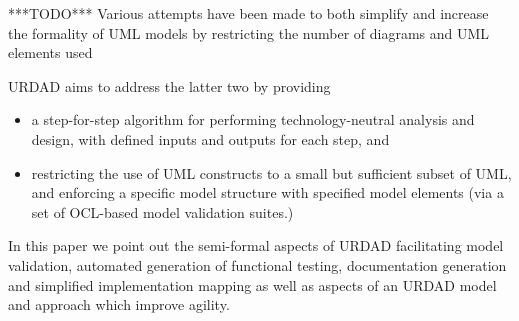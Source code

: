 ***TODO*** Various attempts have been made to both simplify and increase the formality of UML models by
restricting the number of diagrams and UML elements used 
\cite{Cheng:integratingInformalAndFormalApproachesToRequirementsModelingAndAnalysis}

URDAD aims to address the latter two by providing
\begin{itemize}
  \item a step-for-step algorithm for performing technology-neutral analysis and design, with defined inputs and outputs for each
step, and
  \item restricting the use of UML constructs to a small but sufficient subset of UML, and enforcing a specific model structure with specified model elements (via a set of OCL-based model validation suites.)
\end{itemize}


In this paper we point out the semi-formal aspects of URDAD facilitating model validation,
automated generation of functional testing, documentation generation and simplified implementation mapping as well as aspects of an URDAD model and approach which improve agility.
